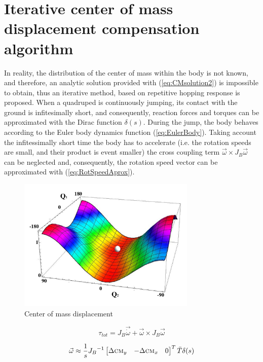 \section{Iterative center of mass displacement compensation algorithm}\label{sec:Algorithm}
In reality, the distribution of the center of mass within the body is not known, and therefore, an analytic solution provided with (\ref{eq:CMsolution2}) is impossible to obtain, thus an iterative method, based on repetitive hopping response is proposed. When a quadruped is continuously jumping, its contact with the ground is infitesimally short, and consequently, reaction forces and torques can be approximated with the Dirac function $\delta (s)$. During the jump, the body behaves according to the Euler body dynamics function (\ref{eq:EulerBody}). Taking account the infitessimally short time the body has to accelerate (i.e. the rotation speeds are small, and their product is event smaller) the cross coupling term $\vec{\omega}\times J_B\vec{\omega}$ can be neglected and, consequently, the rotation speed vector can be approximated with (\ref{eq:RotSpeedAprox}).
\begin{figure}
	\centering
	\includegraphics[width=85mm]{./pictures/RobinRepicCM.pdf}
	\caption{Center of mass displacement}
	\label{fig:CM3Dfunction}
\end{figure}

\begin{equation}\label{eq:EulerBody}
\tau_{tot}=J_B\vec{\dot{\omega}}+\vec{\omega}\times J_B\vec{\omega}
\end{equation}

\begin{equation}\label{eq:RotSpeedAprox}
\vec{\omega}\approx \frac{1}{s}{J_B}^{-1}\begin{bmatrix}
\Delta \textsc{cm}_y & -\Delta \textsc{cm}_x & 0
\end{bmatrix}^T\bar{T}\delta(s)
\end{equation}

